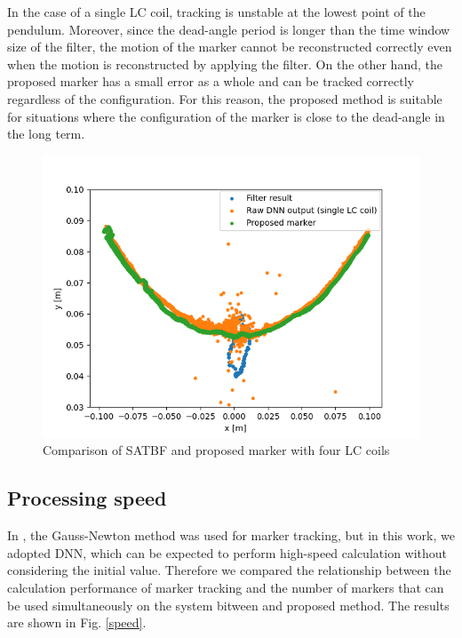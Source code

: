 \documentclass[journal,twoside,web]{ieeecolor}
\begin{document}
In the case of a single LC coil, tracking is unstable at the lowest point of the pendulum. Moreover, since the dead-angle period is longer than the time window size of the filter, the motion of the marker cannot be reconstructed correctly even when the motion is reconstructed by applying the filter. On the other hand, the proposed marker has a small error as a whole and can be tracked correctly regardless of the configuration. For this reason, the proposed method is suitable for situations where the configuration of the marker is close to the dead-angle in the long term.

\begin{figure}[t]
    \centering
    \centerline{\includegraphics[width=\columnwidth]{figure/filter_result_4LC.png}}
    \caption{Comparison of SATBF and proposed marker with four LC coils}
    \label{filter_result_4LC}
\end{figure}

\subsection{Processing speed}
In \cite{im6d}, the Gauss-Newton method was used for marker tracking, but in this work, we adopted DNN, which can be expected to perform high-speed calculation without considering the initial value. Therefore we compared the relationship between the calculation performance of marker tracking and the number of markers that can be used simultaneously on the system bitween \cite{im6d} and proposed method. The results are shown in Fig. \ref{speed}.
\end{document}

